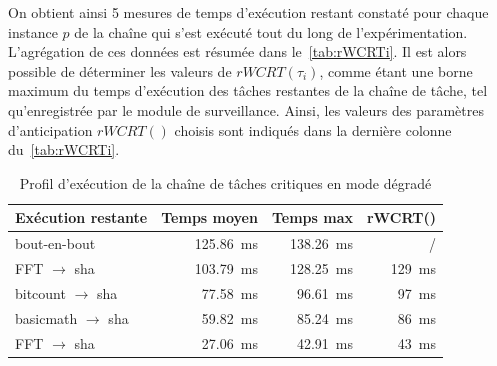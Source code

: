 \documentclass[french, a4paper, 11pt, twoside, pdftex]{StyleThese}
\begin{document}
On obtient ainsi 5 mesures de temps d'exécution restant constaté pour chaque instance $p$ de la chaîne qui s'est exécuté tout du long de l'expérimentation. L'agrégation de ces données est résumée dans le~\autoref{tab:rWCRTi}. Il est alors possible de déterminer les valeurs de $rWCRT(\tau_i)$, comme étant une borne maximum du temps d'exécution des tâches restantes de la chaîne de tâche, tel qu'enregistrée par le module de surveillance.  Ainsi, les valeurs des paramètres d'anticipation $rWCRT()$ choisis sont indiqués dans la dernière colonne du~\autoref{tab:rWCRTi}.


\begin{table}[ht]
  	\centering
	\caption{Profil d'exécution de la chaîne de tâches critiques en mode dégradé} \label{tab:rWCRTi}
	\begin{tabular}{@{}lrrr@{}}
		\toprule
		Exécution restante  			& Temps moyen 	& Temps max	&	rWCRT()	\\ 
		\midrule
		bout-en-bout 					& 125.86~ms     & 138.26~ms	&	/		\\ 
		FFT $\rightarrow$ sha			& 103.79~ms     & 128.25~ms	&	129~ms	\\
		bitcount $\rightarrow$ sha      & 77.58~ms      &  96.61~ms	&	97~ms	\\
		basicmath $\rightarrow$ sha     & 59.82~ms      &  85.24~ms	&	86~ms	\\
		FFT\up{-1} $ \rightarrow$ sha   & 27.06~ms      &  42.91~ms	&	43~ms	\\
		\bottomrule
	\end{tabular}
\end{table}
\end{document}
